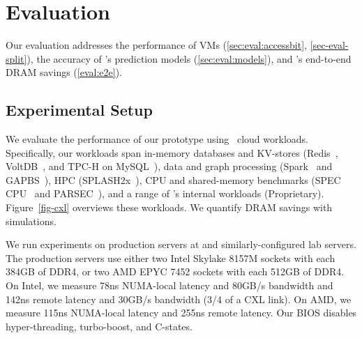 \section{Evaluation}
\label{sec-eval}

Our evaluation addresses the performance of \cvn VMs (\sec\ref{sec:eval:accessbit}, \sec\ref{sec-eval-split}), the accuracy of \sys's prediction models (\sec\ref{sec:eval:models}), and \sys's end-to-end DRAM savings (\sec\ref{eval:e2e}).


\begin{comment}
\begin{enumerate}[leftmargin=9pt]

\item[-] What is the performance of \cvn VMs?
  (\sec\ref{sec:eval:accessbit}, \sec\ref{sec-eval-split})

    \item[-] How accurate are \sys's prediction models?
        (\sec\ref{sec:eval:models})

    \item[-] What are \sys's end-to-end DRAM savings?
        (\sec\ref{eval:e2e})


\end{enumerate}
\end{comment}

\subsection{Experimental Setup}
\label{sec-eval-setup}

We evaluate the performance of our prototype using \numTotalApps\ cloud workloads.
Specifically, our workloads span in-memory databases and KV-stores (Redis~\cite{redis.web21}, VoltDB~\cite{voltdb.web21}, and TPC-H on MySQL~\cite{tpch.web21}), data and graph processing (Spark~\cite{hibench.web21} and GAPBS~\cite{gapbs.corr15}), HPC (SPLASH2x~\cite{parsec3.can16}), CPU and shared-memory benchmarks (SPEC CPU~\cite{speccpu2017.web21} and PARSEC~\cite{parsec.pact08}), and a range of \azure's internal workloads (Proprietary).
Figure~\ref{fig-cxl} overviews these workloads.
We quantify DRAM savings with simulations.

 We run experiments on production servers at \azure and similarly-configured lab servers.
The production servers use either two Intel Skylake 8157M sockets with each 384GB of DDR4, or two AMD EPYC 7452 sockets with each 512GB of DDR4.
On Intel, we measure 78ns NUMA-local latency and 80GB/s bandwidth and 142ns remote latency and 30GB/s bandwidth (3/4 of a CXL  link).
On AMD, we measure 115ns NUMA-local latency and 255ns remote latency.
Our BIOS disables hyper-threading, turbo-boost, and C-states.


